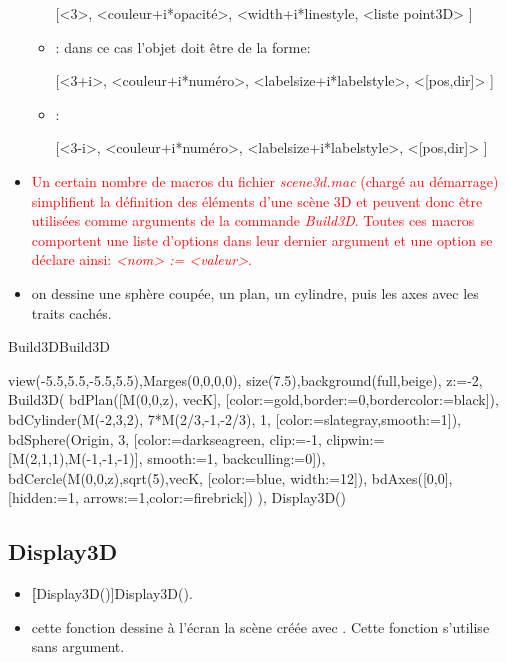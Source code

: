 \begin{itemize}
\begin{itemize}
\centerline{[<3>, <couleur+i*opacité>, <width+i*linestyle, <liste point3D> ]}

  \item {}: dans ce cas l'objet doit être de la forme: 

\centerline{[<3+i>, <couleur+i*numéro>, <labelsize+i*labelstyle>, <[pos,dir]> ]}

  \item {}: 

\centerline{[<3-i>, <couleur+i*numéro>, <labelsize+i*labelstyle>, <[pos,dir]> ]}
  \end{itemize}

 \item \textcolor{red}{Un certain nombre de macros du fichier \textit{scene3d.mac} (chargé au démarrage) simplifient la définition des éléments d'une scène 3D et peuvent donc être utilisées comme arguments de la commande \textsl{Build3D}. Toutes ces macros comportent une liste d'options dans leur dernier argument et une option se déclare ainsi: \textit{<nom> := <valeur>}.}
 \item \exem on dessine une sphère coupée, un plan, un cylindre, puis les axes avec les traits cachés.
\end{itemize}


\pngtrue
\begin{demo}{Build3D}{Build3D}
\begin{texgraph}[name=Build3D, export=eps]
 view(-5.5,5.5,-5.5,5.5),Marges(0,0,0,0), 
 size(7.5),background(full,beige),
 z:=-2,
 Build3D(
  bdPlan([M(0,0,z), vecK],
   [color:=gold,border:=0,bordercolor:=black]),
  bdCylinder(M(-2,3,2), 7*M(2/3,-1,-2/3), 1,
   [color:=slategray,smooth:=1]),
  bdSphere(Origin, 3,
   [color:=darkseagreen, clip:=-1,
   clipwin:=[M(2,1,1),M(-1,-1,-1)],
   smooth:=1, backculling:=0]),
  bdCercle(M(0,0,z),sqrt(5),vecK,
   [color:=blue, width:=12]),
  bdAxes([0,0],
   [hidden:=1, arrows:=1,color:=firebrick])
  ),
 Display3D() 
\end{texgraph}
\end{demo}
\pngfalse

\subsection{Display3D}\label{cmdDisplay3D}

\begin{itemize}
 \item \util \textbf[Display3D()]{Display3D()}.
 \item \desc cette fonction dessine à l'écran la scène créée avec . Cette fonction s'utilise sans argument.
\end{itemize}


